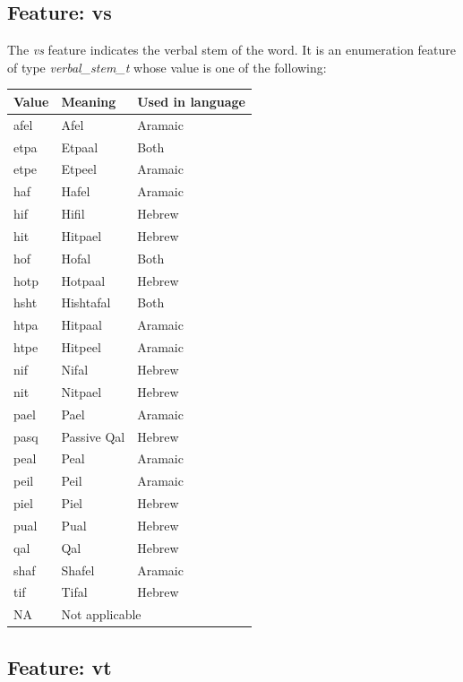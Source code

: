 \documentclass[11pt,oneside,a4paper]{memoir}
\begin{document}
\subsection{Feature: vs}

The \emph{vs} feature indicates the verbal stem of the word. It is an enumeration feature of type
\emph{verbal\_stem\_t} whose value is one of the following:

\begin{center}
  \begin{tabular}{lll}
    \textbf{Value} & \textbf{Meaning} & \textbf{Used in language}\\
    \hline
    afel & Afel & Aramaic\\
    etpa & Etpaal & Both\\
    etpe & Etpeel & Aramaic\\
    haf  & Hafel & Aramaic\\
    hif  & Hifil & Hebrew\\
    hit  & Hitpael & Hebrew\\
    hof  & Hofal & Both\\
    hotp & Hotpaal & Hebrew\\
    hsht & Hishtafal & Both\\
    htpa & Hitpaal & Aramaic\\
    htpe & Hitpeel & Aramaic\\
    nif  & Nifal & Hebrew\\
    nit  & Nitpael & Hebrew\\
    pael & Pael & Aramaic\\
    pasq & Passive Qal & Hebrew\\
    peal & Peal & Aramaic\\
    peil & Peil & Aramaic\\
    piel & Piel & Hebrew\\
    pual & Pual & Hebrew\\
    qal  & Qal & Hebrew\\
    shaf & Shafel & Aramaic\\
    tif  & Tifal & Hebrew\\
    NA   & \multicolumn{2}{l}{Not applicable} \\
  \end{tabular}
\end{center}

\subsection{Feature: vt}
\end{document}
